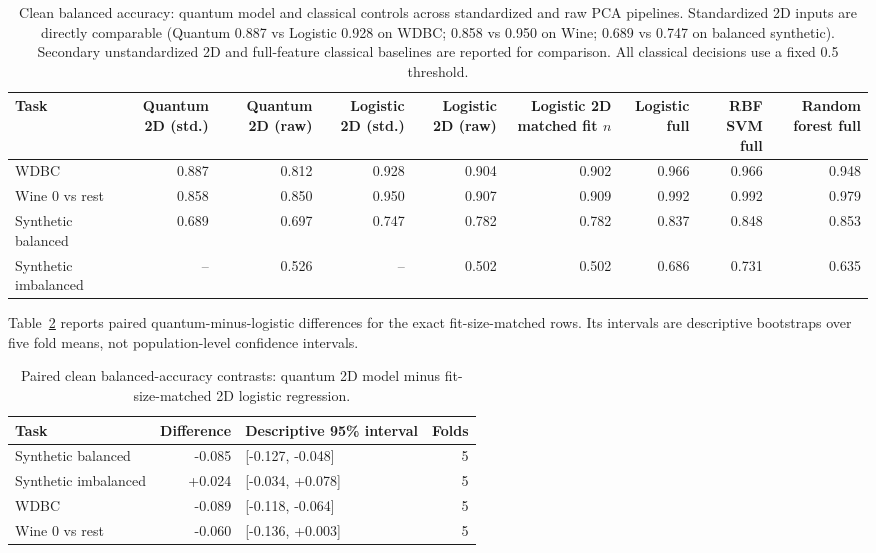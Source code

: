 \documentclass[conference]{IEEEtran}
\begin{document}
\begin{table}[t]\centering\scriptsize
\caption{Clean balanced accuracy: quantum model and classical controls across standardized and raw PCA pipelines. Standardized 2D inputs are directly comparable (Quantum 0.887 vs Logistic 0.928 on WDBC; 0.858 vs 0.950 on Wine; 0.689 vs 0.747 on balanced synthetic). Secondary unstandardized 2D and full-feature classical baselines are reported for comparison. All classical decisions use a fixed 0.5 threshold.}
\label{tab:classical}
\begin{tabular}{@{}l r r r r r r r r@{}}\toprule
Task & Quantum 2D (std.) & Quantum 2D (raw) & Logistic 2D (std.) & Logistic 2D (raw) & Logistic 2D matched fit $n$ & Logistic full & RBF SVM full & Random forest full \\
\midrule
WDBC & 0.887 & 0.812 & 0.928 & 0.904 & 0.902 & 0.966 & 0.966 & 0.948 \\
Wine 0 vs rest & 0.858 & 0.850 & 0.950 & 0.907 & 0.909 & 0.992 & 0.992 & 0.979 \\
Synthetic balanced & 0.689 & 0.697 & 0.747 & 0.782 & 0.782 & 0.837 & 0.848 & 0.853 \\
Synthetic imbalanced & -- & 0.526 & -- & 0.502 & 0.502 & 0.686 & 0.731 & 0.635 \\
\bottomrule\end{tabular}\end{table}
Table~\ref{tab:classicalpaired} reports paired quantum-minus-logistic differences for the exact fit-size-matched rows. Its intervals are descriptive bootstraps over five fold means, not population-level confidence intervals.
\begin{table}[t]\centering\small
\caption{Paired clean balanced-accuracy contrasts: quantum 2D model minus fit-size-matched 2D logistic regression.}
\label{tab:classicalpaired}
\begin{tabular}{@{}l r l r@{}}\toprule
Task & Difference & Descriptive 95\% interval & Folds \\
\midrule
Synthetic balanced & -0.085 & [-0.127, -0.048] & 5 \\
Synthetic imbalanced & +0.024 & [-0.034, +0.078] & 5 \\
WDBC & -0.089 & [-0.118, -0.064] & 5 \\
Wine 0 vs rest & -0.060 & [-0.136, +0.003] & 5 \\
\bottomrule\end{tabular}\end{table}
\end{document}
